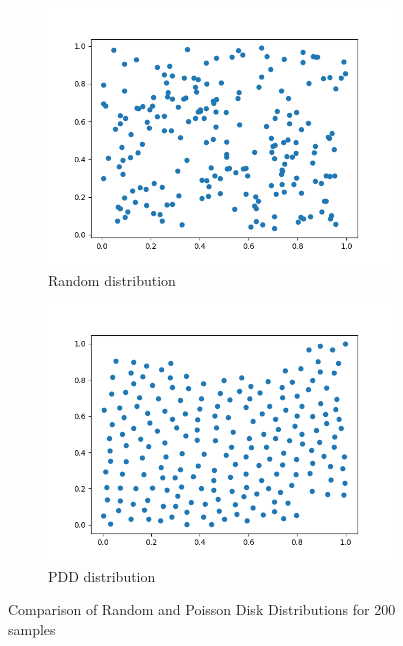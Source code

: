 \documentclass{article}
\begin{document}
\begin{figure}
    \begin{subfigure}[h]{0.5\linewidth}
        \includegraphics[width=\linewidth]{figures/distribution_random.png}
        \caption{Random distribution}
    \end{subfigure}
    \begin{subfigure}[h]{0.5\linewidth}
        \includegraphics[width=\linewidth]{figures/distribution_pdd.png}
        \caption{PDD distribution}
    \end{subfigure}
    \caption{Comparison of Random and Poisson Disk Distributions for 200 samples}
    \label{fig:random-distributions}
\end{figure}
\end{document}

